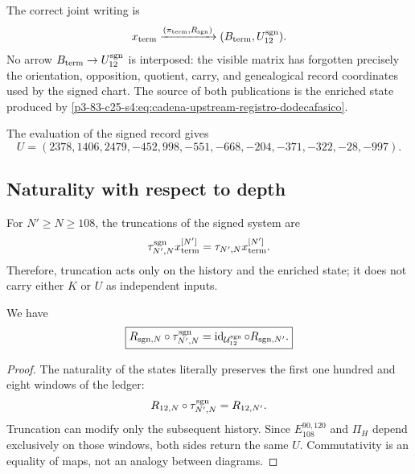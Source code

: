 The correct joint writing is
\begin{equation}
 x_{\rm term}
 \xrightarrow{(\pi_{\rm term},R_{\rm sgn})}
 (B_{\rm term},U_{12}^{\rm sgn}).
 \label{p3-83-c25-s4:eq:doble-publicacion-terminal}
\end{equation}
No arrow
\(B_{\rm term}\to U_{12}^{\rm sgn}\) is interposed: the visible matrix has forgotten
precisely the orientation, opposition, quotient, carry, and genealogical
record coordinates used by the signed chart. The source of both publications is
the enriched state produced by \eqref{p3-83-c25-s4:eq:cadena-upstream-registro-dodecafasico}.

The evaluation of the signed record gives
\begin{equation}
 \boxed{
 U=(2378,1406,2479,-452,998,-551,
 -668,-204,-371,-322,-28,-997).}
 \label{p3-83-c25-s4:eq:vector-u-firmado-autonomo}
\end{equation}

\subsection{Naturality with respect to depth}

For \(N'\geq N\geq108\), the truncations of the signed system are
\begin{equation}
 \tau_{N',N}^{\rm sgn}
 x_{\rm term}^{[N']}
 =\tau_{N',N}x_{\rm term}^{[N']}.
 \label{p3-83-c25-s4:eq:truncamiento-preserva-ku-autonomo}
\end{equation}
Therefore, truncation acts only on the history and the enriched
state; it does not carry either \(K\) or \(U\) as independent inputs.

\begin{theorem}
\label{p3-83-c25-s4:thm:naturalidad-lector-firmado-autonomo}
We have
\begin{equation}
 \boxed{
 R_{{\rm sgn},N}\circ\tau_{N',N}^{\rm sgn}
 =\operatorname{id}_{\mathcal U_{12}^{\rm sgn}}
  \circ R_{{\rm sgn},N'}.}
 \label{p3-83-c25-s4:eq:cuadrado-naturalidad-lector-firmado}
\end{equation}
\end{theorem}

\begin{proof}
The naturality of the states literally preserves the first one hundred and eight
windows of the ledger:
\[
 R_{12,N}\circ\tau_{N',N}^{\rm sgn}=R_{12,N'}.
\]
Truncation can modify only the subsequent history. Since
\(E_{108}^{90,120}\) and \(\Pi_H\) depend exclusively on those windows,
both sides return the same \(U\). Commutativity is an equality of
maps, not an analogy between diagrams.
\end{proof}

